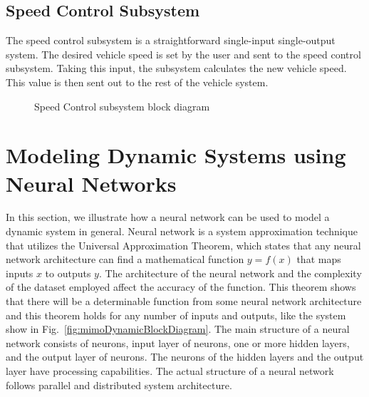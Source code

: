 \documentclass[journal,twoside,web]{ieeecolor}
\begin{document}
  \subsection{Speed Control Subsystem}
  The speed control subsystem is a straightforward single-input single-output system. The desired vehicle speed is set by the user and sent to the speed control subsystem. Taking this input, the subsystem calculates the new vehicle speed. This value is then sent out to the rest of the vehicle system. 
 \begin{figure}[htbp]
    \centering
    \caption{Speed Control subsystem block diagram}
    \label{fig:speedControlModelArchitecture}
 \end{figure}



 \section{Modeling Dynamic Systems using Neural Networks}

 In this section, we illustrate how a neural network can be used to model a
 dynamic system in general. Neural network is a system approximation technique
 that utilizes the Universal Approximation Theorem, which states that any neural network architecture
 can find a mathematical function $y=f(x)$ that maps inputs $x$ to outputs $y$. The architecture of the 
 neural network and the complexity of the dataset employed affect the accuracy of the function. This theorem
 shows that there will be a determinable function from some neural network architecture and this theorem holds
 for any number of inputs and outputs, like the system show in Fig.~\ref{fig:mimoDynamicBlockDiagram}. 
 The main structure of a neural network consists of neurons, input layer of
 neurons, one or more hidden layers, and the output layer of neurons. The
 neurons of the hidden layers and the output layer have processing capabilities.
 The actual structure of a neural network follows parallel and distributed system
 architecture.
\end{document}
